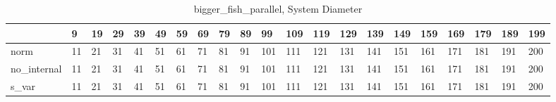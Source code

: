 \begin{table}
\centering
\caption{bigger_fish_parallel, System Diameter}
\label{bigger_fish_parallel_diam}
\begin{tabular}{lllllllllllllllllllll}
\toprule
{} &   9 &  19 &  29 &  39 &  49 &  59 &  69 &  79 &  89 &   99 &  109 &  119 &  129 &  139 &  149 &  159 &  169 &  179 &  189 &  199 \\
\midrule
norm        &  11 &  21 &  31 &  41 &  51 &  61 &  71 &  81 &  91 &  101 &  111 &  121 &  131 &  141 &  151 &  161 &  171 &  181 &  191 &  200 \\
no\_internal &  11 &  21 &  31 &  41 &  51 &  61 &  71 &  81 &  91 &  101 &  111 &  121 &  131 &  141 &  151 &  161 &  171 &  181 &  191 &  200 \\
s\_var       &  11 &  21 &  31 &  41 &  51 &  61 &  71 &  81 &  91 &  101 &  111 &  121 &  131 &  141 &  151 &  161 &  171 &  181 &  191 &  200 \\
\bottomrule
\end{tabular}
\end{table}

